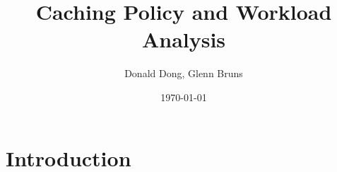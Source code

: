 \documentclass[a4paper,12pt]{article}
\title{Caching Policy and Workload Analysis}
\author{Donald Dong, Glenn Bruns}
\date{\today}
\begin{document}
\maketitle

\section{Introduction}
\end{document}
